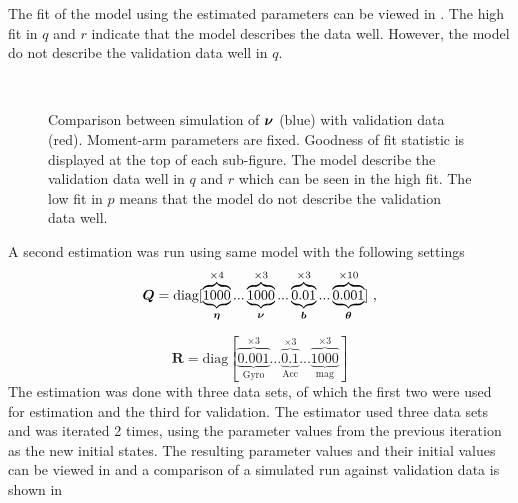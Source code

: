 The fit of the model using the estimated parameters can be viewed in . The high fit in $q$ and $r$ indicate that the model describes the data well. However, the model do not describe the validation data well in $q$.
\begin{figure}[tbp]
  \centering
  \qquad
  \\
  \caption{\label{fig:ResultKalmanFixedMomentArms}%
    Comparison between simulation of $\boldsymbol{\nu}$ (blue) with validation data (red). Moment-arm parameters are fixed. Goodness of fit statistic is displayed at the top of each sub-figure. The model describe the validation data well in $q$ and $r$ which can be seen in the high fit. The low fit in $p$ means that the model do not describe the validation data well.}
\end{figure}

A second estimation was run using same model with the following settings
\begin{equation*}
\boldsymbol{Q}=\text{diag}[\underbrace{\overbrace{1000}^{\times4}}_{\boldsymbol{\eta}}... \underbrace{\overbrace{1000}^{\times3}}_{\boldsymbol{\nu}}...\underbrace{\overbrace{0.01}^{\times3}}_{\boldsymbol{b}}... \underbrace{\overbrace{0.001}^{\times10}}_{\boldsymbol{\theta}}]\text{ ,}
\end{equation*}

\begin{equation*}
\boldsymbol{R} = \text{diag}[\underbrace{\overbrace{0.001}^{\times3}}_{\text{Gyro}}... \underbrace{\overbrace{0.1}^{\times3}}_{\text{Acc}}... \underbrace{\overbrace{1000}^{\times3}}_{\text{mag}}]
\end{equation*}
The estimation was done with three data sets, of which the first two were used for estimation and the third for validation. The estimator used three data sets and was iterated 2 times, using the parameter values from the previous iteration as the new initial states. The resulting parameter values and their initial values can be viewed in  and a comparison of a simulated run against validation data is shown in 


